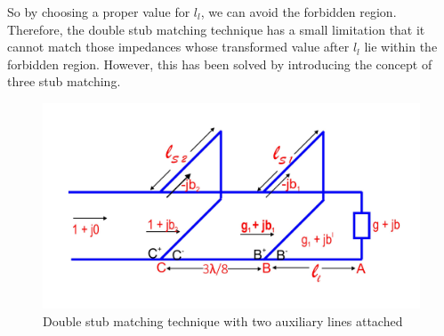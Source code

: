 So by choosing a proper value for $l_l$, we can avoid the forbidden region. Therefore, the double stub matching technique has a small limitation that it cannot match those impedances whose transformed value after $l_l$ lie within the forbidden region. However, this has been solved by introducing the concept of three stub matching.
\begin{figure}[h]
\centering
\includegraphics[width=1\linewidth]{./graphics/fig12}
\caption{Double stub matching technique with two auxiliary lines attached}
\end{figure} 

